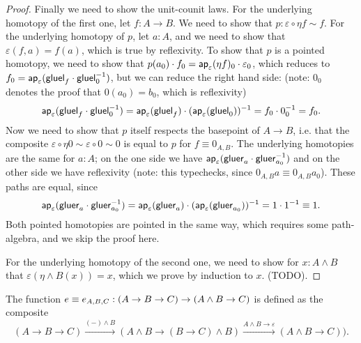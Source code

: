 \documentclass{article}
\newcommand{\pmap}{\to}
\newcommand{\lpmap}{\xrightarrow}
\renewcommand{\smash}{\wedge}
\renewcommand{\epsilon}{\varepsilon}
\newcommand{\tr}{\cdot}
\renewcommand{\o}{\ensuremath{\circ}}
\newcommand{\gluel}{\mathsf{gluel}}
\newcommand{\gluer}{\mathsf{gluer}}
\newcommand{\sy}{^{-1}}
\begin{document}
\begin{proof}
  Finally we need to show the unit-counit laws. For the underlying homotopy of the first one, let
  $f:A\to B$. We need to show that $p:\epsilon\o\eta f\sim f$. For the underlying homotopy of $p$,
  let $a:A$, and we need to show that $\epsilon(f,a)=f(a)$, which is true by reflexivity. To show
  that $p$ is a pointed homotopy, we need to show that
  $p(a_0)\tr f_0=\mapfunc{\epsilon}(\eta f)_0\tr \epsilon_0$, which reduces to
  $f_0=\mapfunc{\epsilon}(\gluel_f\tr\gluel_0\sy)$, but we can reduce the right hand side: (note:
  $0_0$ denotes the proof that $0(a_0)=b_0$, which is reflexivity)
  $$\mapfunc{\epsilon}(\gluel_f\tr\gluel_0\sy)=\mapfunc{\epsilon}(\gluel_f)\tr(\mapfunc{\epsilon}(\gluel_0))\sy=f_0\tr 0_0\sy=f_0.$$
  Now we need to show that $p$ itself respects the basepoint of $A\to B$, i.e. that the composite
  $\epsilon\o\eta0\sim\epsilon\o0\sim0$ is equal to $p$ for $f\equiv 0_{A,B}$. The underlying
  homotopies are the same for $a : A$; on the one side we have
  $\mapfunc{\epsilon}(\gluer_{a}\tr\gluer_{a_0}\sy)$ and on the other side we have reflexivity
  (note: this typechecks, since $0_{A,B}a\equiv0_{A,B}a_0$). These paths are equal, since
  $$\mapfunc{\epsilon}(\gluer_{a}\tr\gluer_{a_0}\sy)=\mapfunc{\epsilon}(\gluer_{a})\tr(\mapfunc\epsilon(\gluer_{a_0}))\sy=1\cdot1\sy\equiv1.$$
  Both pointed homotopies are pointed in the same way, which requires some path-algebra, and we skip
  the proof here.

  For the underlying homotopy of the second one, we need to show for $x:A\smash B$ that
  $\epsilon(\eta\smash B(x))=x$, which we prove by induction to $x$. (TODO).

\end{proof}

\begin{defn}
The function $e\jdeq e_{A,B,C}:(A\pmap B\pmap C)\pmap(A\smash B\pmap C)$ is defined as the composite
$$(A\pmap B\pmap C)\lpmap{({-})\smash B}(A\smash B\pmap (B\pmap C)\smash B)\lpmap{A\smash B \pmap\epsilon}(A\smash B\pmap C)).$$
\end{defn}
\end{document}

